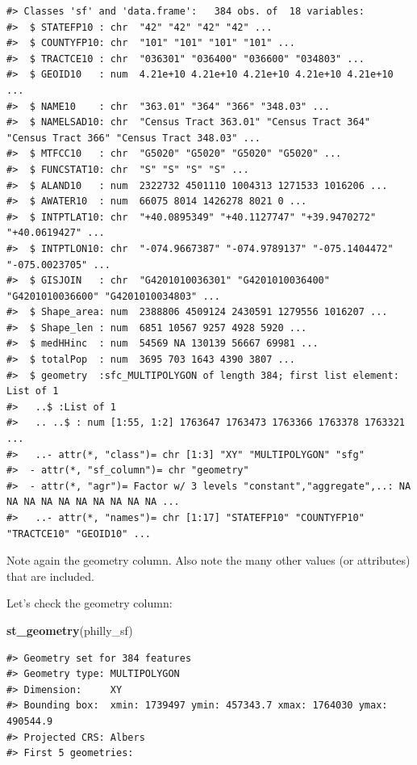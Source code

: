 \documentclass[
]{book}
\newenvironment{Shaded}{\begin{snugshade}}{\end{snugshade}}
\newcommand{\FunctionTok}[1]{\textcolor[rgb]{0.13,0.29,0.53}{\textbf{#1}}}
\newcommand{\NormalTok}[1]{#1}
\begin{document}
\begin{verbatim}
#> Classes 'sf' and 'data.frame':   384 obs. of  18 variables:
#>  $ STATEFP10 : chr  "42" "42" "42" "42" ...
#>  $ COUNTYFP10: chr  "101" "101" "101" "101" ...
#>  $ TRACTCE10 : chr  "036301" "036400" "036600" "034803" ...
#>  $ GEOID10   : num  4.21e+10 4.21e+10 4.21e+10 4.21e+10 4.21e+10 ...
#>  $ NAME10    : chr  "363.01" "364" "366" "348.03" ...
#>  $ NAMELSAD10: chr  "Census Tract 363.01" "Census Tract 364" "Census Tract 366" "Census Tract 348.03" ...
#>  $ MTFCC10   : chr  "G5020" "G5020" "G5020" "G5020" ...
#>  $ FUNCSTAT10: chr  "S" "S" "S" "S" ...
#>  $ ALAND10   : num  2322732 4501110 1004313 1271533 1016206 ...
#>  $ AWATER10  : num  66075 8014 1426278 8021 0 ...
#>  $ INTPTLAT10: chr  "+40.0895349" "+40.1127747" "+39.9470272" "+40.0619427" ...
#>  $ INTPTLON10: chr  "-074.9667387" "-074.9789137" "-075.1404472" "-075.0023705" ...
#>  $ GISJOIN   : chr  "G4201010036301" "G4201010036400" "G4201010036600" "G4201010034803" ...
#>  $ Shape_area: num  2388806 4509124 2430591 1279556 1016207 ...
#>  $ Shape_len : num  6851 10567 9257 4928 5920 ...
#>  $ medHHinc  : num  54569 NA 130139 56667 69981 ...
#>  $ totalPop  : num  3695 703 1643 4390 3807 ...
#>  $ geometry  :sfc_MULTIPOLYGON of length 384; first list element: List of 1
#>   ..$ :List of 1
#>   .. ..$ : num [1:55, 1:2] 1763647 1763473 1763366 1763378 1763321 ...
#>   ..- attr(*, "class")= chr [1:3] "XY" "MULTIPOLYGON" "sfg"
#>  - attr(*, "sf_column")= chr "geometry"
#>  - attr(*, "agr")= Factor w/ 3 levels "constant","aggregate",..: NA NA NA NA NA NA NA NA NA NA ...
#>   ..- attr(*, "names")= chr [1:17] "STATEFP10" "COUNTYFP10" "TRACTCE10" "GEOID10" ...
\end{verbatim}

Note again the geometry column. Also note the many other values (or attributes) that are included.

Let's check the geometry column:

\begin{Shaded}
\begin{Highlighting}[]
\FunctionTok{st\_geometry}\NormalTok{(philly\_sf) }
\end{Highlighting}
\end{Shaded}

\begin{verbatim}
#> Geometry set for 384 features 
#> Geometry type: MULTIPOLYGON
#> Dimension:     XY
#> Bounding box:  xmin: 1739497 ymin: 457343.7 xmax: 1764030 ymax: 490544.9
#> Projected CRS: Albers
#> First 5 geometries:
\end{verbatim}
\end{document}

